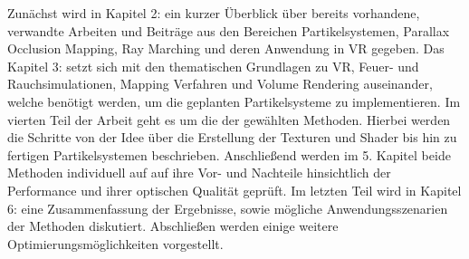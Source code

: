 Zunächst wird in Kapitel 2: \textbf{} ein kurzer Überblick über bereits vorhandene, verwandte Arbeiten
und Beiträge aus den Bereichen Partikelsystemen, Parallax Occlusion Mapping, Ray Marching und deren Anwendung in VR gegeben.
Das Kapitel 3: \textbf{} setzt sich mit den thematischen Grundlagen zu VR, Feuer- und Rauchsimulationen,
Mapping Verfahren und Volume Rendering auseinander, welche benötigt werden, um die geplanten Partikelsysteme zu implementieren.
Im vierten Teil der Arbeit geht es um die \textbf{} der gewählten Methoden. Hierbei werden die Schritte 
von der Idee über die Erstellung der Texturen und Shader bis hin zu fertigen Partikelsystemen beschrieben.
Anschließend werden im 5. Kapitel \textbf{} beide  Methoden individuell auf auf ihre Vor- und Nachteile hinsichtlich 
der Performance und ihrer optischen Qualität geprüft. 
Im letzten Teil wird in Kapitel 6: \textbf{} eine Zusammenfassung der Ergebnisse, sowie mögliche Anwendungsszenarien
der Methoden diskutiert. Abschließen werden einige weitere Optimierungsmöglichkeiten vorgestellt. 




